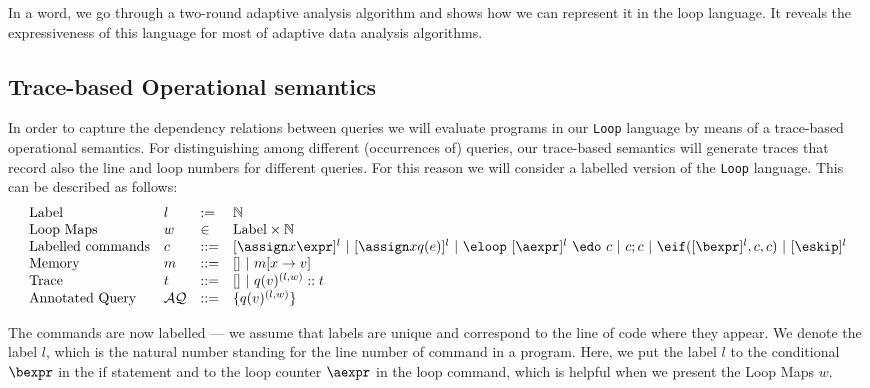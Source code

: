 In a word, we go through a two-round adaptive analysis algorithm and shows how we can represent it in the loop language. It reveals the expressiveness of this language for most of adaptive data analysis algorithms. 

\subsection{ Trace-based Operational semantics}
In order to capture the dependency relations between queries we will evaluate programs in our {\tt Loop} language by means of a trace-based operational semantics. For distinguishing among different (occurrences of) queries, our trace-based semantics will generate traces that record also the line and loop numbers for different queries. For this reason we will consider a labelled version of the {\tt Loop} language. This can be described as follows:
\[
\begin{array}{llll}
 \mbox{Label} & l & := & \mathbb{N} \\ 
 \mbox{Loop Maps} & w & \in & \mbox{Label} \times \mathbb{N} \\
\mbox{Labelled commands} & c & ::= &   [\assign x \expr]^{l} ~|~  [\assign x q(e)]^{l}
 ~|~  \eloop ~ [\aexpr]^{l} ~ \edo ~ c  ~|~ c;c  ~|~ \eif([\bexpr]^l, c, c) 	 ~|~ [\eskip]^{l} \\
%
\mbox{Memory} & m & ::= & [] ~|~ m[x \to v] \\
\mbox{Trace} & t & ::= & [] ~|~ q(v)^{(l, w) } :: t \\
\mbox{Annotated Query} & \mathcal{AQ}  & ::= & \{ q(v)^{(l,w)}  \}
\end{array}
\]

The commands are now labelled --- we assume that labels are unique and correspond to the line of code where they appear. We denote the label $l$, which is the natural number standing for the line number of command in a program. Here, we put the label $l$ to the conditional $\bexpr$ in the if statement and to the loop counter $\aexpr$ in the loop command, which is helpful when we present the Loop Maps $w$.  

